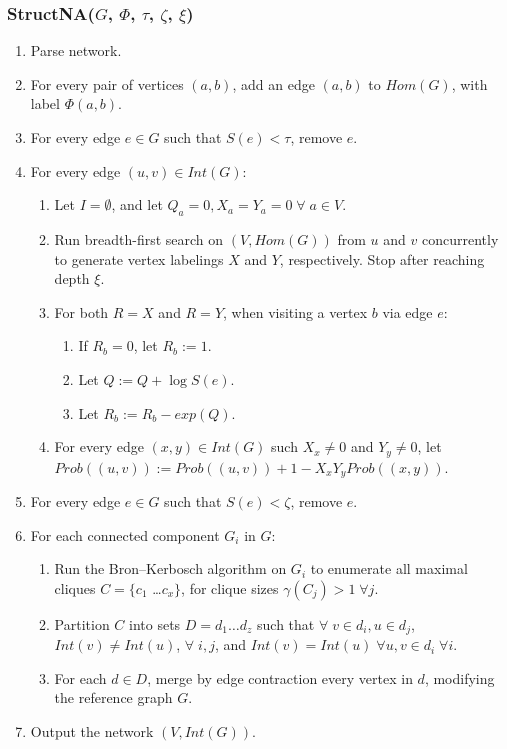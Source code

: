 \documentclass[12pt,twoside]{article}
\begin{document}
\subsubsection{StructNA($G$, $\Phi$, $\tau$, $\zeta$, $\xi$)}
\begin{enumerate}
\item Parse network.
\item For every pair of vertices $(a,b)$, add an edge $(a,b)$ to $Hom(G)$, with label $ \Phi(a,b)$.
\item For every edge $e \in G$ such that $S(e) < \tau$, remove $e$.
\item For every edge $(u,v) \in Int(G)$:
\begin{enumerate}
\item Let $I=\emptyset$, and let $Q_a = 0, X_a = Y_a = 0 \; \forall \; a \in V$.
\item Run breadth-first search on $(V, Hom(G))$ from $u$ and $v$ concurrently to generate vertex labelings $X$ and $Y$, respectively. Stop after reaching depth $\xi$.
\item For both $R=X$ and $R=Y$, when visiting a vertex $b$ via edge $e$:
\begin{enumerate}
\item If $R_b=0$, let $R_b := 1$.
\item Let $Q := Q + \log S(e)$.
\item Let $R_b := R_b - exp(Q)$.
\end{enumerate}
\item For every edge $(x,y) \in Int(G)$ such $X_x \neq 0$ and $Y_y \neq 0$, let $Prob((u,v)) := Prob((u,v)) + 1 - X_x Y_y Prob((x,y))$.
\end{enumerate}
\item For every edge $e \in G$ such that $S(e) < \zeta$, remove $e$.
\item For each connected component $G_i$ in $G$:
\begin{enumerate}
\item Run the Bron--Kerbosch algorithm on $G_i$ to enumerate all maximal cliques $C = \{ c_1$ \ldots $c_x \}$, for clique sizes $\gamma(C_j) > 1 \; \forall j$.
\item Partition $C$ into sets $D = d_1 \ldots d_z$ such that $\forall \; v \in d_i, u \in d_j$, $Int(v) \neq Int(u)$, $\forall \; i,j$, and $Int(v) = Int(u) \; \forall u,v \in d_i \; \forall i$.
\item For each $d \in D$, merge by edge contraction every vertex in $d$, modifying the reference graph $G$.
\end{enumerate}
\item Output the network $(V, Int(G))$.
\end{enumerate}
\end{document}
